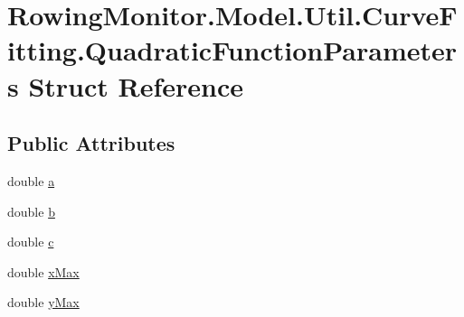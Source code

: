 \hypertarget{struct_rowing_monitor_1_1_model_1_1_util_1_1_curve_fitting_1_1_quadratic_function_parameters}{}\section{Rowing\+Monitor.\+Model.\+Util.\+Curve\+Fitting.\+Quadratic\+Function\+Parameters Struct Reference}
\label{struct_rowing_monitor_1_1_model_1_1_util_1_1_curve_fitting_1_1_quadratic_function_parameters}
\subsection*{Public Attributes}
\begin{DoxyCompactItemize}
\item 
double \hyperlink{struct_rowing_monitor_1_1_model_1_1_util_1_1_curve_fitting_1_1_quadratic_function_parameters_a32e4362875df9f14ce040d57678e2788}{a}
\item 
double \hyperlink{struct_rowing_monitor_1_1_model_1_1_util_1_1_curve_fitting_1_1_quadratic_function_parameters_afe1a5177263ae1fa5a9077a0c5747b95}{b}
\item 
double \hyperlink{struct_rowing_monitor_1_1_model_1_1_util_1_1_curve_fitting_1_1_quadratic_function_parameters_a9e1baacfac496277b584a696bc83bbba}{c}
\item 
double \hyperlink{struct_rowing_monitor_1_1_model_1_1_util_1_1_curve_fitting_1_1_quadratic_function_parameters_ac0528b38840754899c904c31efd81545}{x\+Max}
\item 
double \hyperlink{struct_rowing_monitor_1_1_model_1_1_util_1_1_curve_fitting_1_1_quadratic_function_parameters_a7265f213951d92146c03ddc6235964f5}{y\+Max}
\end{DoxyCompactItemize}
